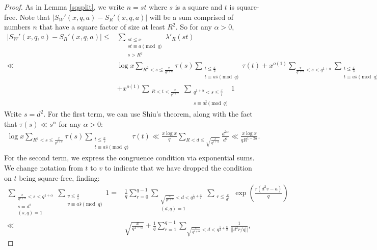 \documentclass{amsart}
\begin{document}
\begin{proof}
As in Lemma \ref{sqsplit}, we write $n=st$ where $s$ is a square and $t$ is square-free.  Note that $|S_W'(x,q,a)-S_R'(x,q,a)|$ will be a sum comprised of numbers $n$ that have a square factor of size at least $R^2$.  So for any $\alpha>0$,
\begin{align*}|S_W'(x,q,a)-S_R'(x,q,a)|\leq &\sum_{\substack{st\leq x \\ st\equiv a\pmod q \\ s>R^2}}\lambda'_R(st)\\
\ll &\log x\sum_{R^2<s\leq \frac{x}{q^{1+\alpha}}}\tau(s)\sum_{\substack{t\leq \frac xs \\ t\equiv a\bar s\pmod q}}\tau(t)+x^{o(1)}\sum_{\frac{x}{q^{1+\alpha}}<s<q^{1+\alpha}}\sum_{\substack{t\leq \frac xs \\ t\equiv a\bar s\pmod q}}1\\
&+x^{o(1)}\sum_{\substack{R<t<\frac{x}{q^{1+\alpha}}  }}\sum_{\substack{q^{1+\alpha}<s\leq \frac xt \\ \\ s\equiv a\bar t\pmod q}}1
\end{align*}
Write $s=d^2$.  For the first term, we can use Shiu's theorem, along with the fact that $\tau(s)\ll s^{\alpha}$ for any $\alpha>0$:
\begin{gather}\label{firstWterm}\log x\sum_{R^2<s\leq \frac{x}{q^{1+\alpha}}}\tau(s)\sum_{\substack{t\leq \frac xs \\ t\equiv a\bar s\pmod q}}\tau(t)\ll \frac{x\log x}{q}\sum_{R<d\leq \sqrt{\frac x{q^{1+\alpha}}}}\frac{d^{2\alpha}}{d^2}\ll \frac{x\log x}{qR^{1-2\alpha}}.
\end{gather}
For the second term, we express the congruence condition via exponential sums.  We change notation from $t$ to $v$ to indicate that we have dropped the condition on $t$ being square-free, finding:
\begin{align*}\sum_{\substack{\frac{x}{q^{1+\alpha}}<s<q^{1+\alpha} \\ s=d^2 \\ (s,q)=1}}\sum_{\substack{v\leq \frac xs \\ v\equiv a\bar s\pmod q}}1=&\frac 1q\sum_{r=0}^{q-1}\sum_{\substack{\sqrt{\frac x{q^{1+\alpha}}}<d<q^{\frac 12+\frac \alpha 2}\\ (d,q)=1}}\sum_{\substack{r\leq \frac x{d^2} }}\exp\left(\frac{r(d^2v-a)}{q}\right)\\
\ll &\sqrt{\frac{x}{q^{1-\alpha}}}+\frac 1q\sum_{r=1}^{q-1}\sum_{\sqrt{\frac x{q^{1+\alpha}}}<d<q^{\frac 12+\frac \alpha 2}}\frac{1}{||d^2r/q||},

\end{align*}
\end{proof}
\end{document}
